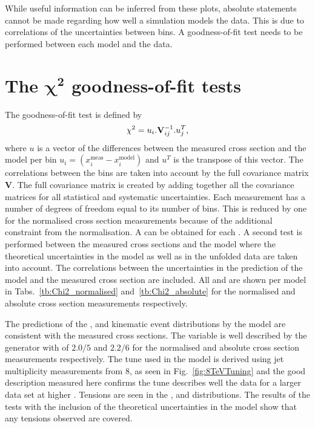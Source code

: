 While useful information can be inferred from these plots, absolute statements cannot be made regarding how well a simulation models the data.
This is due to correlations of the uncertainties between bins.
A \chisq{} goodness-of-fit test needs to be performed between each model and the data.


\section{The $\mathbf{\chi^2}$ goodness-of-fit tests} %
\label{sec:the_goodness_of_fit_tests}

The \chisq{} goodness-of-fit test is defined by 
\begin{equation*}
	\chi^2 = u_{i} . \mathbf{V}^{-1}_{ij} . u^{T}_{j},
\end{equation*}
where $u$ is a vector of the differences between the measured cross section and the model per bin $u_{i}=(x_i^{\mathrm{meas}}-x_i^{\mathrm{model}})$ and $u^{T}$ is the transpose of this vector.
The correlations between the bins are taken into account by the full covariance matrix $\mathbf{V}$.
The full covariance matrix is created by adding together all the covariance matrices for all statistical and systematic uncertainties. 
Each measurement has a number of degrees of freedom equal to its number of bins.
This is reduced by one for the normalised cross section measurements because of the additional constraint from the normalisation.
A \pvalue{} can be obtained for each \chisndf{}.
A second \chisq{} test is performed between the measured cross sections and the \powhegpythia{} model where the theoretical uncertainties in the model as well as in the unfolded data are taken into account.
The correlations between the uncertainties in the prediction of the model and the measured cross section are included.
All \chisndf{} and \pvalues{} are shown per \ttbar{} model in Tabs.~\ref{tb:Chi2_normalised} and~\ref{tb:Chi2_absolute} for the normalised and absolute cross section measurements respectively.

The predictions of the \ST{}, \ptmiss{} and \LPT{} kinematic event distributions by the \powhegpythia{} model are consistent with the measured cross sections.
The \NJET{} variable is well described by the \powhegpythia{} generator with \chisndf{} of $2.0/5$ and $2.2/6$ for the normalised and absolute cross section measurements respectively.
The tune \CUET{} used in the \powhegpythia{} model is derived using jet multiplicity measurements from 8\TeV{}, as seen in Fig.~\ref{fig:8TeVTuning} and the good description measured here confirms the tune describes well the data for a larger data set at higher \sqrts{}.
Tensions are seen in the \ST{}, \WPT{} and \LETA{} distributions.
The results of the \chisq{} tests with the inclusion of the theoretical uncertainties in the \powhegpythia{} model show that any tensions observed are covered.

